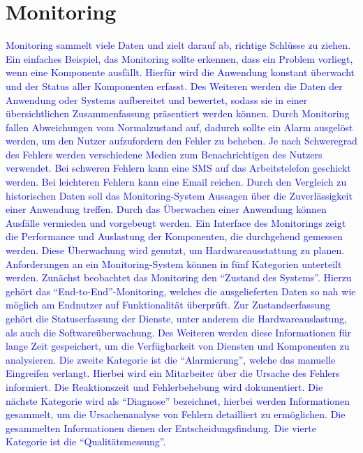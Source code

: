 \section{Monitoring}\label{sec:monitoring}
\textcolor{blue}{
    Monitoring sammelt viele Daten und zielt darauf ab, richtige Schlüsse zu ziehen.
    Ein einfaches Beispiel, das Monitoring sollte erkennen, dass ein Problem vorliegt, wenn eine Komponente ausfällt.
    Hierfür wird die Anwendung konstant überwacht und der Status aller Komponenten erfasst.
    Des Weiteren werden die Daten der Anwendung oder Systems aufbereitet und bewertet, sodass sie in einer übersichtlichen Zusammenfassung präsentiert werden können.
    Durch Monitoring fallen Abweichungen vom Normalzustand auf, dadurch sollte ein Alarm ausgelöst werden, um den Nutzer aufzufordern den Fehler zu beheben.
    Je nach Schweregrad des Fehlers werden verschiedene Medien zum Benachrichtigen des Nutzers verwendet.
    Bei schweren Fehlern kann eine SMS auf das Arbeitstelefon geschickt werden.
    Bei leichteren Fehlern kann eine Email reichen.
    Durch den Vergleich zu historischen Daten soll das Monitoring-System Aussagen über die Zuverlässigkeit einer Anwendung treffen.
    Durch das Überwachen einer Anwendung können Ausfälle vermieden und vorgebeugt werden.
    Ein Interface des Monitorings zeigt die Performance und Auslastung der Komponenten, die durchgehend gemessen werden.
    Diese Überwachung wird genutzt, um Hardwareausstattung zu planen.
    \\
    Anforderungen an ein Monitoring-System können in fünf Kategorien unterteilt werden.
    Zunächst beobachtet das Monitoring den \enquote{Zustand des Systems}.
    Hierzu gehört das \enquote{End-to-End}-Monitoring, welches die ausgelieferten Daten so nah wie möglich am Endnutzer auf Funktionalität überprüft.
    Zur Zustandserfassung gehört die Statuserfassung der Dienste, unter anderem die Hardwareauslastung, als auch die Softwareüberwachung.
    Des Weiteren werden diese Informationen für lange Zeit gespeichert, um die Verfügbarkeit von Diensten und Komponenten zu analysieren.
    Die zweite Kategorie ist die \enquote{Alarmierung}, welche das manuelle Eingreifen verlangt.
    Hierbei wird ein Mitarbeiter über die Ursache des Fehlers informiert.
    Die Reaktionszeit und Fehlerbehebung wird dokumentiert.
    Die nächste Kategorie wird als \enquote{Diagnose} bezeichnet, hierbei werden Informationen gesammelt, um die Ursachenanalyse von Fehlern detailliert zu ermöglichen.
    Die gesammelten Informationen dienen der Entscheidungsfindung.
    Die vierte Kategorie ist die \enquote{Qualitätsmessung}.
}
